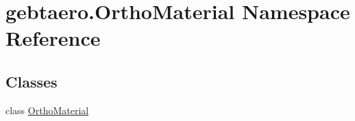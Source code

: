 \hypertarget{namespacegebtaero_1_1_ortho_material}{}\section{gebtaero.\+Ortho\+Material Namespace Reference}
\label{namespacegebtaero_1_1_ortho_material}
\subsection*{Classes}
\begin{DoxyCompactItemize}
\item 
class \hyperlink{classgebtaero_1_1_ortho_material_1_1_ortho_material}{Ortho\+Material}
\end{DoxyCompactItemize}
